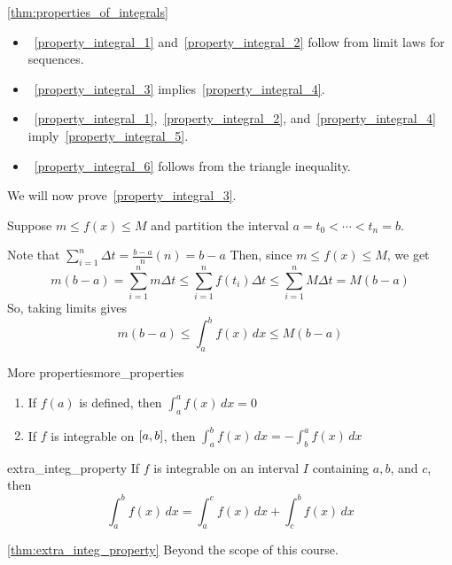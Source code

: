 \begin{Proof}{\ref{thm:properties_of_integrals}}{}
    \begin{itemize}
        \item~\ref{property_integral_1} and~\ref{property_integral_2} follow from limit laws
              for sequences.
        \item~\ref{property_integral_3} implies~\ref{property_integral_4}.
        \item~\ref{property_integral_1},~\ref{property_integral_2},
              and~\ref{property_integral_4} imply~\ref{property_integral_5}.
        \item~\ref{property_integral_6} follows from the triangle inequality.
    \end{itemize}

    We will now prove~\ref{property_integral_3}.

    Suppose $ m\le f(x)\le M $ and partition the interval
    $ a=t_0<\cdots<t_n=b $.

    Note that
    $ \displaystyle\sum\limits_{i=1}^{n} \Delta t=\frac{b-a}{n}(n)=b-a $
    Then, since $ m\le f(x)\le M $, we get
    \[ m(b-a)=\sum\limits_{i=1}^{n} m\Delta t\le \sum\limits_{i=1}^{n} f(t_i)\Delta t
        \le \sum\limits_{i=1}^{n} M\Delta t=M(b-a) \]
    So, taking limits gives
    \[ m(b-a)\le \int_{a}^{b} f(x)\,d{x} \le M(b-a) \]
\end{Proof}

\begin{Definition}{More properties}{more_properties}
    \begin{enumerate}[label=(\Roman*)]
        \item If $ f(a) $ is defined, then
              $ \displaystyle\int_{a}^{a} f(x)\, d{x} =0 $
        \item If $ f $ is integrable on $ \interval{a}{b} $, then
              $ \displaystyle\int_{a}^{b} f(x)\, d{x}=-\int_{b}^{a} f(x)\, d{x} $
    \end{enumerate}
\end{Definition}

\begin{Theorem}{}{extra_integ_property}
    If $ f $ is integrable on an interval $ I $ containing $ a,b $, and $ c $, then
    \[ \int_{a}^{b} f(x)\, d{x}=\int_{a}^{c} f(x)\, d{x}+\int_{c}^{b} f(x)\, d{x} \]
\end{Theorem}

\begin{Proof}{\ref{thm:extra_integ_property}}{}
    Beyond the scope of this course.
\end{Proof}

